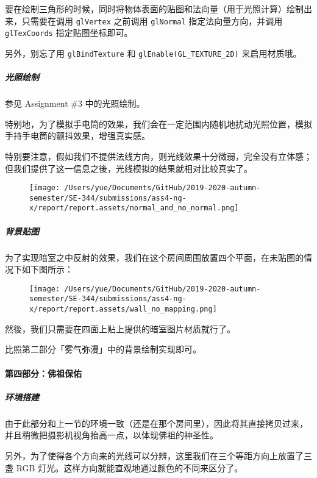 \documentclass[
]{article}
\begin{document}
要在绘制三角形的时候，同时将物体表面的贴图和法向量（用于光照计算）绘制出来，只需要在调用
\texttt{glVertex} 之前调用 \texttt{glNormal} 指定法向量方向，并调用
\texttt{glTexCoords} 指定贴图坐标即可。

另外，别忘了用 \texttt{glBindTexture} 和
\texttt{glEnable(GL\_TEXTURE\_2D)} 来启用材质哦。

\hypertarget{header-n263}{%
\subparagraph{光照绘制}\label{header-n263}}

参见 Assignment \#3 中的光照绘制。

特别地，为了模拟手电筒的效果，我们会在一定范围内随机地扰动光照位置，模拟手持手电筒的颤抖效果，增强真实感。

特别要注意，假如我们不提供法线方向，则光线效果十分微弱，完全没有立体感；但我们提供了这一信息之後，光线模拟的结果就相对比较真实了。

\begin{figure}
\centering
\texttt{[image: /Users/yue/Documents/GitHub/2019-2020-autumn-semester/SE-344/submissions/ass4-ng-x/report/report.assets/normal\_and\_no\_normal.png]}
\caption{}
\end{figure}

\hypertarget{header-n276}{%
\subparagraph{背景贴图}\label{header-n276}}

为了实现暗室之中反射的效果，我们在这个房间周围放置四个平面，在未贴图的情况下如下图所示：

\begin{figure}
\centering
\texttt{[image: /Users/yue/Documents/GitHub/2019-2020-autumn-semester/SE-344/submissions/ass4-ng-x/report/report.assets/wall\_no\_mapping.png]}
\caption{}
\end{figure}

然後，我们只需要在四面上贴上提供的暗室图片材质就行了。

比照第二部分「雾气弥漫」中的背景绘制实现即可。

\hypertarget{header-n284}{%
\paragraph{第四部分：佛祖保佑}\label{header-n284}}

\hypertarget{header-n286}{%
\subparagraph{环境搭建}\label{header-n286}}

由于此部分和上一节的环境一致（还是在那个房间里），因此将其直接拷贝过来，并且稍微把摄影机视角抬高一点，以体现佛祖的神圣性。

另外，为了使得各个方向来的光线可以分辨，这里我们在三个等距方向上放置了三盏
RGB 灯光。这样方向就能直观地通过颜色的不同来区分了。
\end{document}

